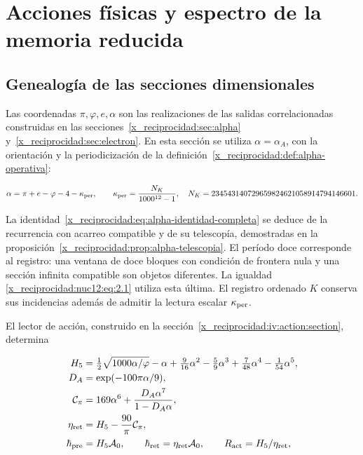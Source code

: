 \chapter{Acciones físicas y espectro de la memoria reducida}
\label{x_reciprocidad:nuclear:12}
\section{Genealogía de las secciones dimensionales}

Las coordenadas \(\pi,\varphi,e,\alpha\) son las realizaciones de las salidas correlacionadas construidas en las secciones~\ref{x_reciprocidad:sec:alpha} y~\ref{x_reciprocidad:sec:electron}. En esta sección se utiliza \(\alpha=\alpha_A\), con la orientación y la periodicización de la definición~\ref{x_reciprocidad:def:alpha-operativa}:



\begin{equation}
\alpha=\pi+e-\varphi-4-\kappa_{\rm per},\qquad
\kappa_{\rm per}=\frac{N_K}{1000^{12}-1},
\quad N_K=234543140729659824621058914794146601.
\label{x_reciprocidad:nuc12:eq:2.1}
\end{equation}



La identidad~\eqref{x_reciprocidad:eq:alpha-identidad-completa} se deduce de la recurrencia con acarreo compatible y de su telescopía, demostradas en la proposición~\ref{x_reciprocidad:prop:alpha-telescopia}. El período doce corresponde al registro: una ventana de doce bloques con condición de frontera nula y una sección infinita compatible son objetos diferentes. La igualdad \eqref{x_reciprocidad:nuc12:eq:2.1} utiliza esta última. El registro ordenado \(K\) conserva sus incidencias además de admitir la lectura escalar \(\kappa_{\rm per}\).

El lector de acción, construido en la sección~\ref{x_reciprocidad:iv:action:section}, determina



\begin{equation}
\begin{aligned}
H_5&=\tfrac12\sqrt{1000\alpha/\varphi}-\alpha+
\tfrac9{16}\alpha^2-\tfrac59\alpha^3+
\tfrac7{48}\alpha^4-\tfrac1{54}\alpha^5,\\
D_A&=\exp(-100\pi\alpha/9),\\
\mathcal C_\pi&=169\alpha^6+\frac{D_A\alpha^7}{1-D_A\alpha},\\
\eta_{\rm ret}&=H_5-\frac{90}{\pi}\mathcal C_\pi,\\
\hbar_{\rm pre}&=H_5\mathcal A_0,\qquad
\hbar_{\rm ret}=\eta_{\rm ret}\mathcal A_0,\qquad
R_{\rm act}=H_5/\eta_{\rm ret},
\end{aligned}
\label{x_reciprocidad:nuc12:eq:2.2}
\end{equation}



